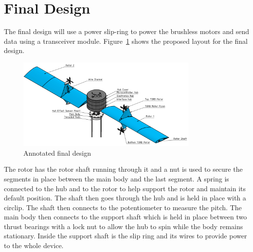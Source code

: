     \section{Final Design}
        The final design will use a power slip-ring to power the brushless motors and send data using a transceiver module. Figure~\ref{fig: annotated_final_design} shows the proposed layout for the final design. 

        \begin{figure} [h]               
            \centering
            \includegraphics*[width = 0.8\textwidth]{figs/Design/Final Design/Annotated_Final_design.png}
            \caption{Annotated final design}
            \label{fig: annotated_final_design}
        \end{figure}
        The rotor has the rotor shaft running through it and a nut is used to secure the segments in place between the main body and the last segment. A spring is connected to the hub and to the rotor to help support the rotor and maintain its default position. The shaft then goes through the hub and is held in place with a circlip. The shaft then connects to the potentiometer to measure the pitch. The main body then connects to the support shaft which is held in place between two thrust bearings with a lock nut to allow the hub to spin while the body remains stationary. Inside the support shaft is the slip ring and its wires to provide power to the whole device. 
        


